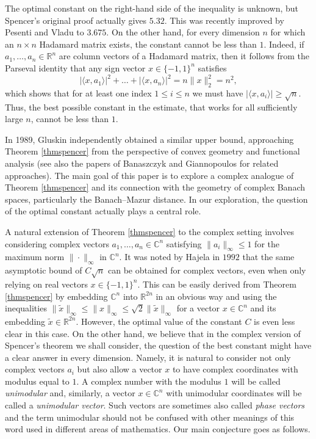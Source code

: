 \documentclass[12pt, a4paper]{article}
\theoremstyle{plain} %
\theoremstyle{definition} %
\theoremstyle{remark} %
\begin{document}
The optimal constant on the right-hand side of the inequality is unknown, but Spencer's original proof actually gives $5.32$. This was recently improved by Pesenti and Vladu \cite{pesenti} to $3.675$. On the other hand, for every dimension $n$ for which an $n \times n$ Hadamard matrix exists, the constant cannot be less than $1$. Indeed, if $a_1, \ldots, a_n \in \mathbb{R}^n$ are column vectors of a Hadamard matrix, then it follows from the Parseval identity that any sign vector $x \in \{-1, 1\}^n$ satisfies
\begin{equation}
\label{parseval}
|\langle x, a_1 \rangle| ^2 + \ldots + |\langle x, a_n\rangle|^2 = n \|x\|_2^2 = n^2,
\end{equation}
which shows that for at least one index $1 \leq i \leq n$ we must have $|\langle x, a_i \rangle| \geq \sqrt{n}$. Thus, the best possible constant in the estimate, that works for all sufficiently large $n$, cannot be less than $1$.


In 1989, Gluskin \cite{gluskin} independently obtained a similar upper bound, approaching Theorem \ref{thmspencer} from the perspective of convex geometry and functional analysis (see also the papers of Banaszczyk \cite{banaszczyk} and Giannopoulos \cite{giann} for related approaches). The main goal of this paper is to explore a complex analogue of Theorem \ref{thmspencer} and its connection with the geometry of complex Banach spaces, particularly the Banach--Mazur distance. In our exploration, the question of the optimal constant actually plays a central role.


A natural extension of Theorem \ref{thmspencer} to the complex setting involves considering complex vectors $a_1, \ldots, a_n \in \mathbb{C}^n$ satisfying $\|a_i\|_{\infty} \leq 1$ for the maximum norm $\| \cdot \|_{\infty}$ in $\mathbb{C}^n$. It was noted by Hajela in $1992$ \cite{hajela} that the same asymptotic bound of $C \sqrt{n}$ can be obtained for complex vectors, even when only relying on real vectors $x \in \{-1, 1\}^n$. This can be easily derived from Theorem \ref{thmspencer} by embedding $\mathbb{C}^n$ into $\mathbb{R}^{2n}$ in an obvious way and using the inequalities $\|\widetilde{x}\|_{\infty} \leq \|x\|_{\infty} \leq \sqrt{2} \|\widetilde{x}\|_{\infty}$ for a vector $x \in \mathbb{C}^n$ and its embedding $\widetilde{x} \in \mathbb{R}^{2n}$. However, the optimal value of the constant $C$ is even less clear in this case. On the other hand, we believe that in the complex version of Spencer's theorem we shall consider, the question of the best constant might have a clear answer in every dimension. Namely, it is natural to consider not only complex vectors $a_i$ but also allow a vector $x$ to have complex coordinates with modulus equal to $1$. A complex number with the modulus $1$ will be called \emph{unimodular} and, similarly, a vector $x \in \mathbb{C}^n$ with unimodular coordinates will be called a \emph{unimodular vector}. Such vectors are sometimes also called \emph{phase vectors} and the term unimodular should not be confused with other meanings of this word used in different areas of mathematics. Our main conjecture goes as follows.
\end{document}
